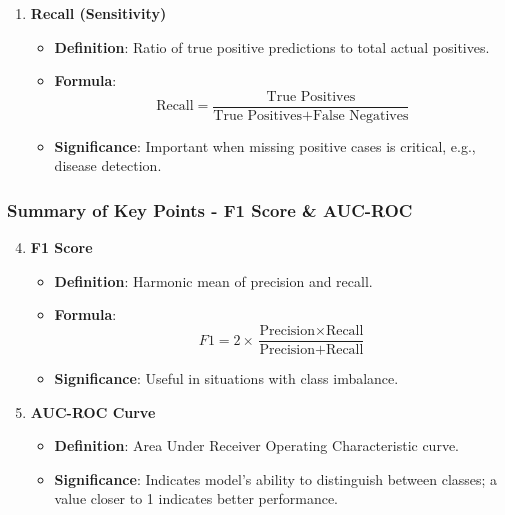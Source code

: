 \documentclass[aspectratio=169]{beamer}
\begin{document}
\begin{frame}[fragile]
\begin{enumerate}
        \item \textbf{Recall (Sensitivity)}
        \begin{itemize}
            \item \textbf{Definition}: Ratio of true positive predictions to total actual positives.
            \item \textbf{Formula}: 
            \begin{equation}
            \text{Recall} = \frac{\text{True Positives}}{\text{True Positives} + \text{False Negatives}}
            \end{equation}
            \item \textbf{Significance}: Important when missing positive cases is critical, e.g., disease detection.
        \end{itemize}
    \end{enumerate}
\end{frame}

\begin{frame}[fragile]
    \frametitle{Summary of Key Points - F1 Score & AUC-ROC}
    \begin{enumerate}
        \setcounter{enumi}{3}
        \item \textbf{F1 Score}
        \begin{itemize}
            \item \textbf{Definition}: Harmonic mean of precision and recall.
            \item \textbf{Formula}: 
            \begin{equation}
            F1 = 2 \times \frac{\text{Precision} \times \text{Recall}}{\text{Precision} + \text{Recall}}
            \end{equation}
            \item \textbf{Significance}: Useful in situations with class imbalance.
        \end{itemize}

        \item \textbf{AUC-ROC Curve}
        \begin{itemize}
            \item \textbf{Definition}: Area Under Receiver Operating Characteristic curve.
            \item \textbf{Significance}: Indicates model's ability to distinguish between classes; a value closer to 1 indicates better performance.
        \end{itemize}
    \end{enumerate}
\end{frame}
\end{document}
